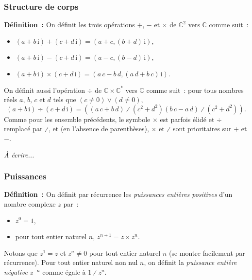 \subsubsection{Structure de corps}

\noindent\textbf{Définition :} 
    \sindex[isy]{$+$} \sindex[isy]{$-$} \sindex[isy]{$\times$} 
    On définit les trois opérations $+$, $-$ et $\times$ de $\mathbb{C}^2$ vers $\mathbb{C}$ comme suit :
    \begin{itemize}[nosep]
        \item $(a + b \, \mathrm{i}) + (c + d \, \mathrm{i}) = (a + c, (b + d) \, \mathrm{i})$,
        \item $(a + b \, \mathrm{i}) - (c + d \, \mathrm{i}) = (a - c, (b - d) \, \mathrm{i})$,
        \item $(a + b \, \mathrm{i}) \times (c + d \, \mathrm{i}) = (a \, c -  b \, d, (a \, d + b \, c) \, \mathrm{i})$.
    \end{itemize}
    \sindex[isy]{$\div$} \sindex[isy]{$\divslash$}
    On définit aussi l'opération $\div$ de $\mathbb{C} \times \mathbb{C}^*$ vers $\mathbb{C}$ comme suit : pour tous nombres réels $a$, $b$, $c$ et $d$ tels que $(c \neq 0) \vee (d \neq 0)$, 
    \begin{equation*}
        (a + b \, \mathrm{i}) \div (c + d \, \mathrm{i}) = 
        \left( 
            \left( a \, c + b \, d \right) \divslash \left( c^2 + d^2 \right)
            \left( b \, c - a \, d \right) \divslash \left( c^2 + d^2 \right)
        \right) .
    \end{equation*}
    Comme pour les ensemble précédents, le symbole $\times$ est parfois élidé et $\div$ remplacé par $\divslash$, et (en l'absence de parenthèses), $\times$ et $\divslash$ sont prioritaires sur $+$ et $-$.

\medskip

\emph{À écrire...}

\subsubsection{Puissances}

\noindent\textbf{Définition :} On définit par récurrence les \emph{puissances entières positives} d'un nombre complexe $z$ par :
    \begin{itemize}[nosep]
        \item $z^0 = 1$,
        \item pour tout entier naturel $n$, $z^{n+1} = z \times z^n$.
    \end{itemize}
    Notons que $z^1 = z$ et $z^n \neq 0$ pour tout entier naturel $n$ (se montre facilement par récurrence).
    Pour tout entier naturel non nul $n$, on définit la \emph{puissance entière négative} $z^{-n}$ comme égale à $1 \divslash z^n$.

